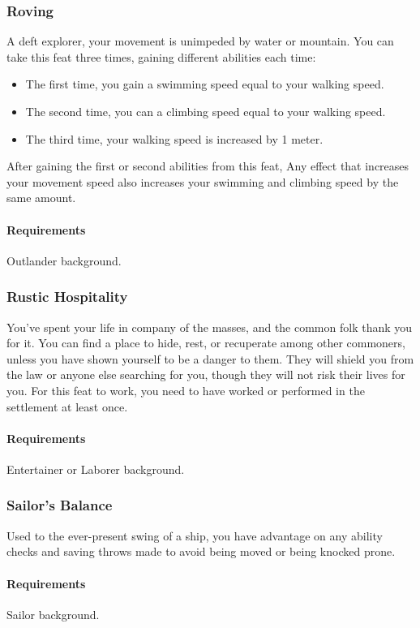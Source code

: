 \subsubsection{Roving} \label{feat::roving}
    A deft explorer, your movement is unimpeded by water or mountain.
    You can take this feat three times, gaining different abilities each time:
    \begin{itemize}
        \item The first time, you gain a swimming speed equal to your walking speed.
        \item The second time, you can a climbing speed equal to your walking speed.
        \item The third time, your walking speed is increased by 1 meter.
    \end{itemize}
    After gaining the first or second abilities from this feat, Any effect that increases your movement speed also increases your swimming and climbing speed by the same amount.
    \paragraph{Requirements} Outlander background.
\subsubsection{Rustic Hospitality} \label{feat::rustichospitality}
    You've spent your life in company of the masses, and the common folk thank you for it.
    You can find a place to hide, rest, or recuperate among other commoners, unless you have shown yourself to be a danger to them.
    They will shield you from the law or anyone else searching for you, though they will not risk their lives for you.
    For this feat to work, you need to have worked or performed in the settlement at least once.
    \paragraph{Requirements} Entertainer or Laborer background.
\subsubsection{Sailor's Balance} \label{feat::sailorsbalance}
    Used to the ever-present swing of a ship, you have advantage on any ability checks and saving throws made to avoid being moved or being knocked prone.
    \paragraph{Requirements} Sailor background.
